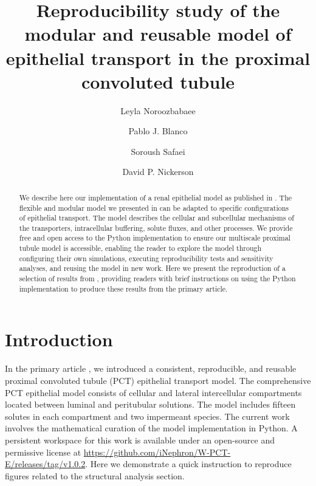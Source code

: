\documentclass[fleqn,10pt]{physiome}
\title{Reproducibility study of the modular and reusable model of epithelial transport in the proximal convoluted tubule}
\author[1][l.noroozbabaee@auckland.ac.nz]{Leyla Noroozbabaee}
\author[2]{Pablo J. Blanco}
\author[1]{Soroush Safaei}
\author[1]{David P. Nickerson}
\affil[1]{Auckland Bioengineering Institute, University of Auckland, New Zealand}
\affil[2]{National Laboratory for Scientific Computing, Petrópolis, Brazil}
\begin{document}
\maketitle
\begin{abstract}
We describe here our implementation of a renal epithelial model as published in \cite{noroozbabaee2022modular}. The flexible and modular model we presented in \cite{noroozbabaee2022modular} can be adapted to specific configurations of epithelial transport. The model describes the cellular and subcellular mechanisms of the transporters, intracellular buffering, solute fluxes, and other processes. We provide free and open access to the Python implementation to ensure our multiscale proximal tubule model is accessible, enabling the reader to explore the model through configuring their own simulations, executing reproducibility tests and sensitivity analyses, and reusing the model in new work.
Here we present the reproduction of a selection of results from \cite{noroozbabaee2022modular}, providing readers with brief instructions on using the Python implementation to produce these results from the primary article.
\end{abstract}


\section{Introduction}
 In the primary article \citep{noroozbabaee2022modular}, we introduced a consistent, reproducible, and reusable proximal convoluted tubule (PCT) epithelial transport model. The comprehensive PCT epithelial model consists of cellular and lateral intercellular compartments located between luminal and peritubular solutions. The model includes fifteen solutes in each compartment and two impermeant species. The current work involves the mathematical curation of the model implementation in Python. A persistent workspace for this work is available under an open-source and permissive license at \url{https://github.com/iNephron/W-PCT-E/releases/tag/v1.0.2}.  
Here we demonstrate a quick instruction to reproduce figures related to the structural analysis section.
\end{document}
